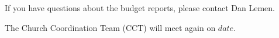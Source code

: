 \documentclass[Letter, 11pt, twoside]{report}
\begin{document}
If you have questions about the budget reports, please contact  
Dan Lemen.

The Church Coordination Team (CCT) will meet again on $date$. 




\end{document}
